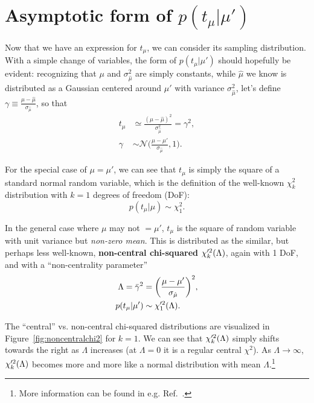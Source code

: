 \section{Asymptotic form of \texorpdfstring{$p(t_\mu|\mu')$}{p(t\_µ|µ')}}

Now that we have an expression for $t_\mu$, we can consider its sampling distribution.
With a simple change of variables, the form of $p(t_\mu|\mu')$ should hopefully be evident:
recognizing that $\mu$ and $\sigma_{\hat\mu}^2$ are simply constants, while $\hat\mu$ we know is distributed as a Gaussian centered around $\mu'$ with variance $\sigma_{\hat\mu}^2$, let's define $\gamma \equiv \frac{\mu-\hat\mu}{\sigma_{\hat\mu}}$, so that
\begin{align}
    t_\mu &\simeq \frac{(\mu-\hat\mu)^2}{\sigma_{\hat\mu}^2} = \gamma^2, \\
    \gamma &\sim \mathcal N \bigg(\frac{\mu - \mu'}{\sigma_{\hat\mu}}, 1 \bigg).
\label{eq:plr_gamma}
\end{align}

For the special case of $\mu = \mu'$, we can see that $t_\mu$ is simply the square of a standard normal random variable, which is the definition of the well-known $\chi^2_k$ distribution with $k=1$ degrees of freedom (DoF):
\begin{equation}
    p(t_\mu|\mu) \sim \chi^2_1.
\label{eq:chi2}
\end{equation}

In the general case where $\mu$ may not $ = \mu'$, $t_\mu$ is the square of random variable with unit variance but \textit{non-zero mean}.
This is distributed as the similar, but perhaps less well-known, \textbf{non-central chi-squared $\chi^{\prime 2}_k(\Lambda)$}, again with 1 DoF, and with a ``non-centrality parameter''
\begin{align}
    \Lambda = \bar\gamma^2 &= \bigg(\frac{\mu - \mu'}{\sigma_{\hat\mu}}\bigg)^2,
  \label{eq:Lambda} \\
    p(t_\mu|\mu') &\sim \chi^{\prime 2}_1(\Lambda).
  \label{eq:noncentralchi2}
\end{align}

The ``central'' vs. non-central chi-squared distributions are visualized in Figure~\ref{fig:noncentralchi2} for $k = 1$.
We can see that $\chi^{\prime 2}_k(\Lambda)$ simply shifts towards the right as $\Lambda$ increases (at $\Lambda = 0$ it is a regular central $\chi^2$).
As $\Lambda \rightarrow \infty$, $\chi^{\prime 2}_k(\Lambda)$ becomes more and more like a normal distribution with mean $\Lambda$.\footnote{More information can be found in e.g. Ref.~\cite{enwiki:1256854724}.
}

